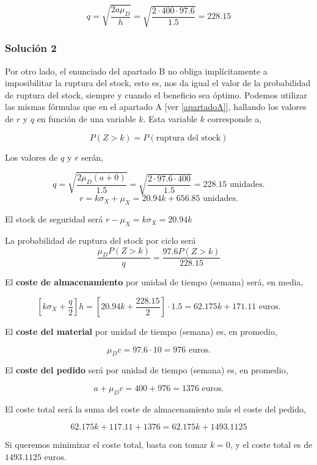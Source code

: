 \documentclass[a4paper,12pt]{article}
\begin{document}
$$ q = \sqrt{\dfrac{2a\mu_D}{h}} = \sqrt{\dfrac{2\cdot 400\cdot 97.6}{1.5}} = 228.15$$

\subsubsection{Soluci\'on 2}
Por otro lado, el enunciado del apartado B no obliga impl\'icitamente a imposibilitar la ruptura del stock, esto es, nos da igual el valor de la probabilidad de ruptura del stock, siempre y cuando el beneficio sea \'optimo. Podemos utilizar las mismas f\'ormulas que en el apartado A [ver \ref{apartadoA}], hallando los valores de $r$ y $q$ en funci\'on de una variable $k$. Esta variable $k$ corresponde a,

$$ P(Z > k) = P(\text{ruptura del stock})$$

Los valores de $q$ y $r$ ser\'an,

$$ q = \sqrt{\dfrac{2\mu_D(a + 0)}{1.5}} = \sqrt{\dfrac{2\cdot 97.6\cdot 400}{1.5}} = 228.15 \text{ unidades.}$$
$$ r = k\sigma_X + \mu_X = 20.94k + 656.85 \text{ unidades.}$$

El stock de seguridad ser\'a $r - \mu_X = k\sigma_X = 20.94k$

La probabilidad de ruptura del stock por ciclo ser\'a $$ \dfrac{\mu_D P(Z > k)}{q} = \dfrac{97.6 P(Z > k)}{228.15}$$

El \textbf{coste de almacenamiento} por unidad de tiempo (semana) ser\'a, en media, 

$$ \left[k\sigma_X + \dfrac{q}{2}\right] h = \left[20.94k + \dfrac{228.15}{2} \right]\cdot 1.5 = 62.175k + 171.11 \text{ euros.}$$

El \textbf{coste del material} por unidad de tiempo (semana) es, en promedio,

$$ \mu_D c = 97.6\cdot 10 = 976 \text{ euros.}$$

El \textbf{coste del pedido} ser\'a por unidad de tiempo (semana) es, en promedio,

$$ a + \mu_D c = 400 + 976 = 1376 \text{ euros.}$$

El coste total ser\'a la suma del coste de almacenamiento m\'as el coste del pedido,

$$ 62.175k + 117.11 + 1376 = 62.175k + 1493.1125$$

Si queremos minimizar el coste total, basta con tomar $k = 0 $, y el coste total es de $1493.1125 \text{ euros.}$
\end{document}
